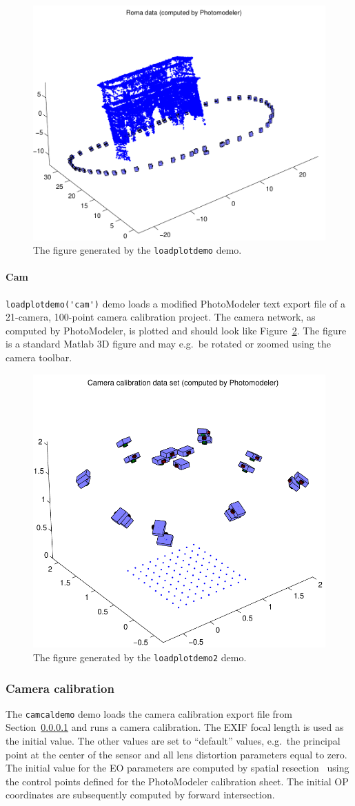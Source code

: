\documentclass{article}
\begin{document}
\begin{figure}
  \centering
  \includegraphics[width=0.5\hsize]{ill/roma}
  \caption{The figure generated by the \texttt{loadplotdemo} demo.}
  \label{fig:roma}
\end{figure}

\paragraph{\sc Cam}
\label{sec:camcaldata}
\verb+loadplotdemo('cam')+ demo loads a modified PhotoModeler text
export file of a 21-camera, 100-point camera calibration project. The
camera network, as computed by PhotoModeler, is plotted and should
look like Figure~\ref{fig:camcalib}. The figure is a standard Matlab
3D figure and may e.g.\ be rotated or zoomed using the camera toolbar.

\begin{figure}
  \centering
  \includegraphics[width=0.45\hsize]{ill/ccam}
  \caption{The figure generated by the \texttt{loadplotdemo2} demo.}
  \label{fig:camcalib}
\end{figure}

\subsubsection{Camera calibration}

The \verb+camcaldemo+ demo loads the camera calibration export file
from Section~\ref{sec:camcaldata} and runs a camera calibration. The
EXIF focal length is used as the initial value. The other values are
set to ``default'' values, e.g.\ the principal point at the center of
the sensor and all lens distortion parameters equal to zero. The
initial value for the EO parameters are computed by spatial
resection~\citep[Chap.~11.1.3.4]{Haralick1994:Review,McGlone2004:Manual} using
the control points defined for the PhotoModeler calibration sheet. The
initial OP coordinates are subsequently computed by forward
intersection.
\end{document}
